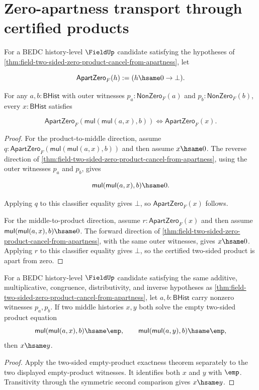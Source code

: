 \section{Zero-apartness transport through certified products}
\label{sec:field-zero-apartness-product-exactness}

\begin{theorem}
\label{thm:field-two-sided-product-apartzero-exact}
For a BEDC history-level $\FieldUp$ candidate satisfying the hypotheses of
\autoref{thm:field-two-sided-zero-product-cancel-from-apartness}, let

$$
\mathsf{ApartZero}_F(h) := (h\hsame0\to\bot).
$$

For any $a,b:\mathsf{BHist}$ with outer witnesses
$p_a:\mathsf{NonZero}_F(a)$ and $p_b:\mathsf{NonZero}_F(b)$, every
$x:\mathsf{BHist}$ satisfies

$$
\mathsf{ApartZero}_F(\mathsf{mul}(\mathsf{mul}(a,x),b))
\Longleftrightarrow
\mathsf{ApartZero}_F(x).
$$
\end{theorem}
\begin{proof}
For the product-to-middle direction, assume
$q:\mathsf{ApartZero}_F(\mathsf{mul}(\mathsf{mul}(a,x),b))$ and then assume
$x\hsame0$. The reverse direction of
\autoref{thm:field-two-sided-zero-product-cancel-from-apartness}, using the
outer witnesses $p_a$ and $p_b$, gives

$$
\mathsf{mul}(\mathsf{mul}(a,x),b)\hsame0.
$$

Applying $q$ to this classifier equality gives $\bot$, so
$\mathsf{ApartZero}_F(x)$ follows.

For the middle-to-product direction, assume
$r:\mathsf{ApartZero}_F(x)$ and then assume
$\mathsf{mul}(\mathsf{mul}(a,x),b)\hsame0$. The forward direction of
\autoref{thm:field-two-sided-zero-product-cancel-from-apartness}, with the
same outer witnesses, gives $x\hsame0$. Applying $r$ to this classifier
equality gives $\bot$, so the certified two-sided product is apart from zero.
\end{proof}

\begin{theorem}
\label{thm:field-two-sided-mul-empty-solution-unique}
For a BEDC history-level $\FieldUp$ candidate satisfying the same additive,
multiplicative, congruence, distributivity, and inverse hypotheses as
\autoref{thm:field-two-sided-zero-product-cancel-from-apartness}, let
$a,b:\mathsf{BHist}$ carry nonzero witnesses $p_a,p_b$. If two middle
histories $x,y$ both solve the empty two-sided product equation
$$
\mathsf{mul}(\mathsf{mul}(a,x),b)\hsame\emp,\qquad
\mathsf{mul}(\mathsf{mul}(a,y),b)\hsame\emp,
$$
then $x\hsame y$.
\end{theorem}
\begin{proof}
Apply the two-sided empty-product exactness theorem separately to the two
displayed empty-product witnesses. It identifies both $x$ and $y$ with
$\emp$. Transitivity through the symmetric second comparison gives
$x\hsame y$.
\end{proof}

